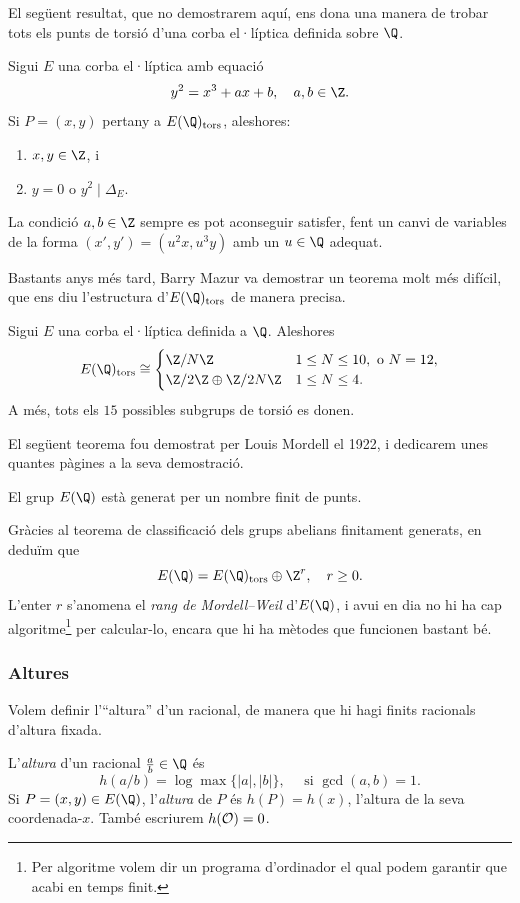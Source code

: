  El següent resultat, que no demostrarem aquí, ens dona una manera de trobar tots els punts de torsió d'una corba el·líptica definida sobre $\Q$.
 \begin{theorem}
 Sigui $E$ una corba el·líptica amb equació
 \[
 y^2=x^3+ax+b,\quad a,b\in\Z.
 \]
 Si $P=(x,y)$ pertany a $E(\Q)_\tors$, aleshores:
 \begin{enumerate}
     \item $x,y\in\Z$, i
     \item $y=0$ o $y^2 \mid \Delta_E$.
 \end{enumerate}
 \end{theorem}
\begin{remark}
La condició $a,b \in\Z$ sempre es pot aconseguir satisfer, fent un canvi de variables de la forma $(x',y') = (u^2 x, u^3 y)$ amb un $u\in\Q$ adequat.
\end{remark}

Bastants anys més tard, Barry Mazur va demostrar un teorema molt més difícil, que ens diu l'estructura d'$E(\Q)_\tors$ de manera precisa.
\begin{theorem}[Mazur, 1978]
Sigui $E$ una corba el·líptica definida a $\Q$. Aleshores
\[
E(\Q)_\tors\cong\begin{cases}
\Z/N\Z & 1 \leq N \leq 10,\text{ o } N=12,\\
\Z/2\Z\oplus \Z/2N\Z & 1\leq N \leq 4.
\end{cases}
\]
A més, tots els $15$ possibles subgrups de torsió es donen.
\end{theorem}

El següent teorema fou demostrat per Louis Mordell el 1922, i dedicarem unes quantes pàgines a la seva demostració.

\begin{theorem}[Mordell, 1922]
El grup $E(\Q)$ està generat per un nombre finit de punts.
\end{theorem}

Gràcies al teorema de classificació dels grups abelians finitament generats, en deduïm que
\[
E(\Q) = E(\Q)_\tors \oplus \Z^r,\quad r\geq 0.
\]
L'enter $r$ s'anomena el \emph{rang de Mordell--Weil} d'$E(\Q)$, i avui en dia no hi ha cap algoritme\footnote{Per algoritme volem dir un programa d'ordinador el qual podem garantir que acabi en temps finit.} per calcular-lo, encara que hi ha mètodes que funcionen bastant bé.

\subsubsection{Altures}
Volem definir l'``altura'' d'un racional, de manera que hi hagi finits racionals d'altura fixada.
\begin{definition}
L'\emph{altura} d'un racional $\frac{a}{b}\in\Q$ és
\[
h(a/b) = \log \max\{|a|,|b|\},\quad\text{ si } \gcd(a,b)=1.
\]
Si $P=(x,y)\in E(\Q)$, l'\emph{altura} de $P$ és $h(P)=h(x)$, l'altura de la seva coordenada-$x$. També escriurem $h(\mathcal{O})=0$.
\end{definition}

